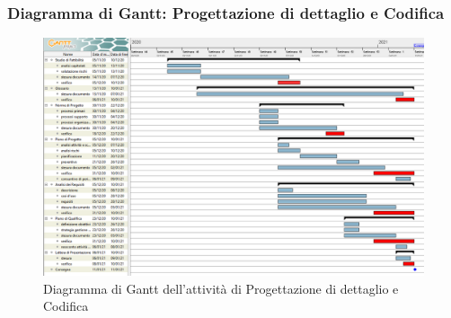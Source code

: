 \subsubsection{Diagramma di Gantt: Progettazione di dettaglio e Codifica}
\begin{figure}[h]
	\includegraphics[scale=0.45]{Images/GanttPianificazioneAnalisi.PNG}
	\caption{Diagramma di Gantt dell'attività di Progettazione di dettaglio e Codifica}
\end{figure}
